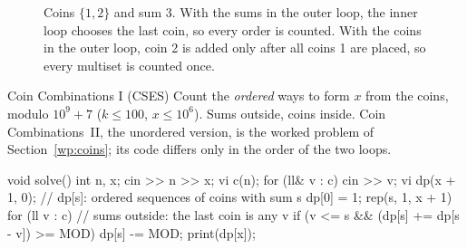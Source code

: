 \begin{figure}[htbp]
\centering
{}
\caption{Coins $\{1, 2\}$ and sum 3. With the sums in the outer loop, the inner loop chooses the last coin, so every order is
counted. With the coins in the outer loop, coin 2 is added only after all coins 1 are placed, so every multiset is counted once.}
\label{fig:coinorder}
\end{figure}

\begin{problem}{Coin Combinations I (CSES)}
Count the \emph{ordered} ways to form $x$ from the coins, modulo $10^9 + 7$ ($k \le 100$, $x \le 10^6$).
\solution Sums outside, coins inside. Coin Combinations~II, the unordered version, is the worked problem of
Section~\ref{wp:coins}; its code differs only in the order of the two loops.
\end{problem}

\begin{code}
void solve() {
    int n, x;
    cin >> n >> x;
    vi c(n);
    for (ll& v : c) cin >> v;
    vi dp(x + 1, 0);  // dp[s]: ordered sequences of coins with sum s
    dp[0] = 1;
    rep(s, 1, x + 1) for (ll v : c)  // sums outside: the last coin is any v
        if (v <= s && (dp[s] += dp[s - v]) >= MOD) dp[s] -= MOD;
    print(dp[x]);
}
\end{code}

